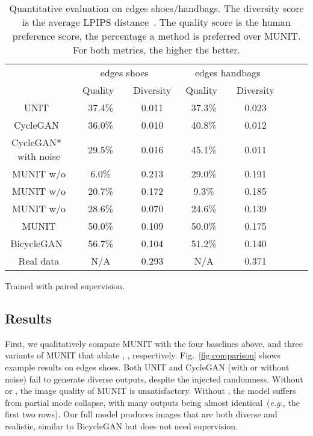 \documentclass[runningheads]{llncs}
\begin{document}
	
	\begin{table}[!tb]
		\addtolength{\tabcolsep}{8pt}
		\renewcommand\arraystretch{1.3}
		\centering
		\small
		\begin{threeparttable}
			\caption{Quantitative evaluation on edges  shoes/handbags. The diversity score is the average LPIPS distance~\cite{zhang2018unreasonable}. The quality score is the human preference score, the percentage a method is preferred over MUNIT. For both metrics, the higher the better.\label{tab:edges}}
\begin{tabular}{|c|c|c|c|c|c|c|c|}
				\hline
				& \multicolumn{2}{c|}{edges  shoes} & \multicolumn{2}{c|}{edges  handbags} \\  \cline{2-5}
				& \ Quality\ \  & Diversity &  \ Quality\ \  & Diversity \\ 
				\hline
				UNIT~\cite{liu2017unsupervised} & 37.4\% & 0.011 & 37.3\%  & 0.023 \\
				CycleGAN~\cite{zhu2017unpaired} & 36.0\% & 0.010 & 40.8\% & 0.012 \\
				CycleGAN*~\cite{zhu2017unpaired} with noise & 29.5\% & 0.016 & 45.1\% & 0.011 \\
				\hline
				MUNIT w/o  & 6.0\% & 0.213 & 29.0\% & 0.191 \\
				MUNIT w/o  & 20.7\% & 0.172 & 9.3\% & 0.185\\
				MUNIT w/o  & 28.6\% & 0.070 & 24.6\% & 0.139 \\
				MUNIT  & 50.0\% & 0.109 & 50.0\% & 0.175 \\
				\hline
				BicycleGAN~\cite{zhu2017toward} & 56.7\%  & 0.104 & 51.2\% & 0.140 \\
				\hline
				Real data & N/A & 0.293 & N/A & 0.371 \\
				\hline
			\end{tabular}
			\begin{tablenotes}
				\item [\dag] Trained with paired supervision.
\end{tablenotes}
\end{threeparttable}
	\end{table}
	
\subsection{Results}
First, we qualitatively compare MUNIT with the four baselines above, and three variants of MUNIT that ablate , ,  respectively. Fig.~\ref{fig:comparison} shows example results on edges  shoes. Both UNIT and CycleGAN (with or without noise) fail to generate diverse outputs, despite the injected randomness. Without  or , the image quality of MUNIT  is unsatisfactory. Without , the model suffers from partial mode collapse, with many outputs being almost identical~(\textit{e.g.}, the first two rows). Our full model produces images that are both diverse and realistic, similar to BicycleGAN but does not need supervision. 
	
\end{document}
